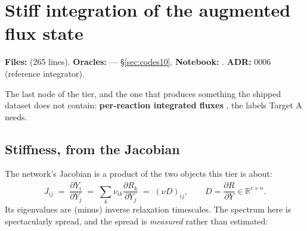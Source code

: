 %

\section{Stiff integration of the augmented flux state}
\label{part:integration}

\begin{repopointer}
\textbf{Files:}  (265 lines). \quad
\textbf{Oracles:}  ---
\S\ref{sec:codes10}. \quad
\textbf{Notebook:} . \quad
\textbf{ADR:} 0006 (reference integrator).
\end{repopointer}

The last node of the tier, and the one that produces something the shipped
dataset does not contain: \textbf{per-reaction integrated fluxes \Phifl}, the
labels Target A needs.

\subsection{Stiffness, from the Jacobian}
\label{sec:stiffness}

The network's Jacobian is a product of the two objects this tier is about:
%
\begin{equation}
J_{ij} \;=\; \frac{\partial \dot Y_i}{\partial Y_j}
\;=\; \sum_k \nu_{ik}\frac{\partial R_k}{\partial Y_j}
\;=\; (\nu D)_{ij}, \qquad
D = \frac{\partial R}{\partial Y}\in\mathbb{R}^{r\times n}.
\label{eq:jacobian}
\end{equation}
%
Its eigenvalues are (minus) inverse relaxation timescales. The spectrum here is
spectacularly spread, and the spread is \emph{measured} rather than estimated:

